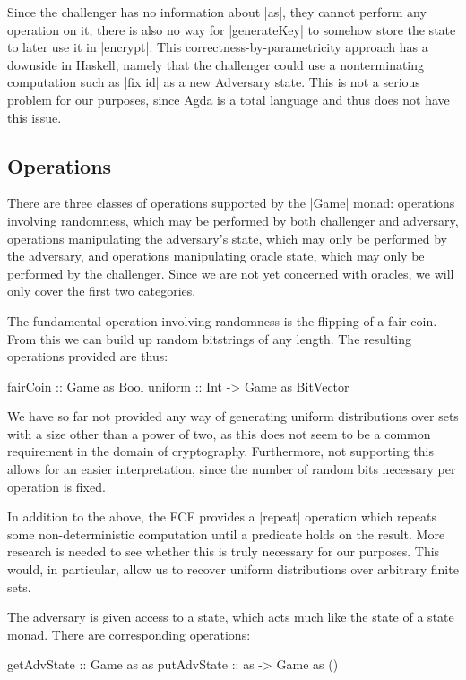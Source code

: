 Since the challenger has no information about |as|, they cannot perform any operation on it; there is also no way for
|generateKey| to somehow store the state to later use it in |encrypt|.  This correctness-by-parametricity approach has a
downside in Haskell, namely that the challenger could use a nonterminating computation such as |fix id| as a new
Adversary state.  This is not a serious problem for our purposes, since Agda is a total language and thus does not have
this issue.

\subsection{Operations}

There are three classes of operations supported by the |Game| monad: operations involving randomness, which may
be performed by both challenger and adversary, operations manipulating the adversary's state, which may only be
performed by the adversary, and operations manipulating oracle state, which may only be performed by the challenger.
Since we are not yet concerned with oracles, we will only cover the first two categories.

The fundamental operation involving randomness is the flipping of a fair coin.  From this we can build up random
bitstrings of any length.  The resulting operations provided are thus:
\begin{code}
fairCoin :: Game as Bool
uniform :: Int -> Game as BitVector
\end{code}

We have so far not provided any way of generating uniform distributions over sets with a size other than a power of two,
as this does not seem to be a common requirement in the domain of cryptography.  Furthermore, not supporting this allows
for an easier interpretation, since the number of random bits necessary per operation is fixed.

In addition to the above, the FCF provides a |repeat| operation which repeats some non-deterministic computation until a
predicate holds on the result.  More research is needed to see whether this is truly necessary for our purposes.  This
would, in particular, allow us to recover uniform distributions over arbitrary finite sets.

The adversary is given access to a state, which acts much like the state of a state monad.  There are corresponding
operations:
\begin{code}
getAdvState :: Game as as
putAdvState :: as -> Game as ()
\end{code}

